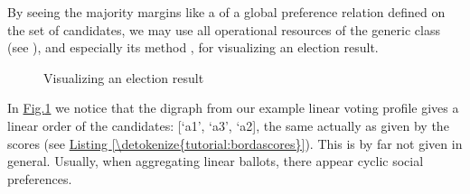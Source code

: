 \documentclass[a4paper,12pt,english]{sphinxhowto}
\let\sphinxpxdimen\pdfpxdimen\else\newdimen\sphinxpxdimen
\begin{document}
By seeing the majority margins like a  of a global preference relation defined on the set of candidates, we may use all operational resources of the generic  class (see {\hyperref[\detokenize{tutorial:digraphs-tutorial-label}]{}}), and especially its  method \sphinxfootnotemark[1], for visualizing an election result.

\begin{sphinxVerbatim}[commandchars=\\\{\},numbers=left,firstnumber=1,stepnumber=1]
\end{sphinxVerbatim}

\begin{figure}[H]
\centering
\capstart

\noindent\sphinxincludegraphics[width=300\sphinxpxdimen]{{tutorialLinearBallots}.png}
\caption{Visualizing an election result}\label{\detokenize{tutorial:tutoriallinearballots}}\end{figure}

In \hyperref[\detokenize{tutorial:tutoriallinearballots}]{Fig.\@ \ref{\detokenize{tutorial:tutoriallinearballots}}} we notice that the  digraph from our example linear voting profile gives a linear order of the candidates: {[}‘a1’, ‘a3’, ‘a2{]}, the same actually as given by the  scores (see \hyperref[\detokenize{tutorial:bordascores}]{Listing \ref{\detokenize{tutorial:bordascores}}}). This is by far not given in general. Usually, when aggregating linear ballots, there appear cyclic social preferences.
\end{document}

